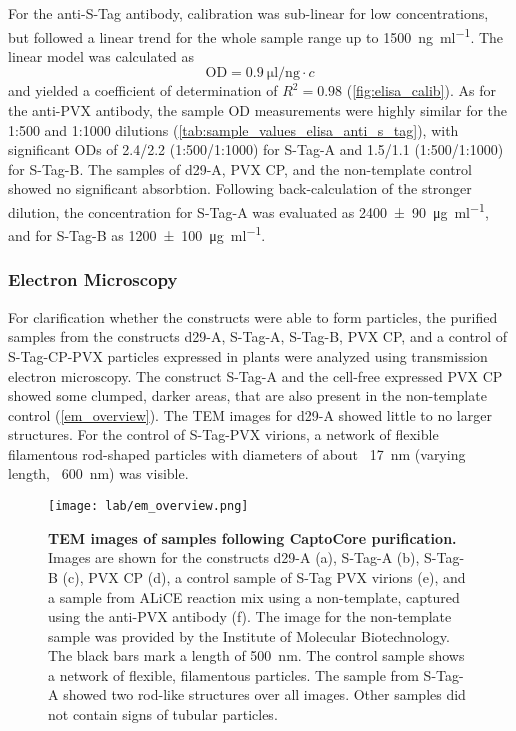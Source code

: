 For the anti-S-Tag antibody, calibration was sub-linear for low concentrations, but followed a linear trend for the whole sample range up to \SI{1500}{\nano\gram\per\milli\litre}. The linear model was calculated as 
\begin{equation}
\text{OD} = \SI{0.9}{\micro\litre\per\nano\gram} \cdot c
\end{equation}
and yielded a coefficient of determination of $R^2 = 0.98$ (\autoref{fig:elisa_calib}). As for the anti-PVX antibody, the sample OD measurements were highly similar for the 1:500 and 1:1000 dilutions (\autoref{tab:sample_values_elisa_anti_s_tag}), with significant ODs of 2.4/2.2 (1:500/1:1000)  for S-Tag-A and 1.5/1.1 (1:500/1:1000) for S-Tag-B. The samples of d29-A, PVX CP, and the non-template control showed no significant absorbtion. Following back-calculation of the stronger dilution, the concentration for S-Tag-A was evaluated as \SI{2400\pm 90}{\micro\gram\per\milli\litre}, and for S-Tag-B as \SI{1200\pm 100}{\micro\gram\per\milli\litre}.

\subsubsection{Electron Microscopy}
For clarification whether the constructs were able to form particles, the purified samples from the constructs d29-A, S-Tag-A, S-Tag-B, PVX CP, and a control of S-Tag-CP-PVX particles expressed in plants were analyzed using transmission electron microscopy. The construct S-Tag-A and the cell-free expressed PVX CP showed some clumped, darker areas, that are also present in the non-template control (\autoref{em_overview}). The TEM images for d29-A showed little to no larger structures. For the control of S-Tag-PVX virions, a network of flexible filamentous rod-shaped particles with diameters of about ~\SI{17}{\nano\meter} (varying length, ~\SI{600}{\nano\meter}) was visible. 

\begin{figure}
\texttt{[image: lab/em\_overview.png]}
\caption{\textbf{TEM images of samples following CaptoCore purification. } Images are shown for the constructs d29-A (a), S-Tag-A (b), S-Tag-B (c), PVX CP (d), a control sample of S-Tag PVX virions (e), and a sample from ALiCE reaction mix using a non-template, captured using the anti-PVX antibody (f). The image for the non-template sample was provided by the Institute of Molecular Biotechnology. The black bars mark a length of \SI{500}{\nano\meter}. The control sample shows a network of flexible, filamentous particles. The sample from S-Tag-A showed two rod-like structures over all images. Other samples did not contain signs of tubular particles. }
\label{fig:em_overview}
\end{figure}


